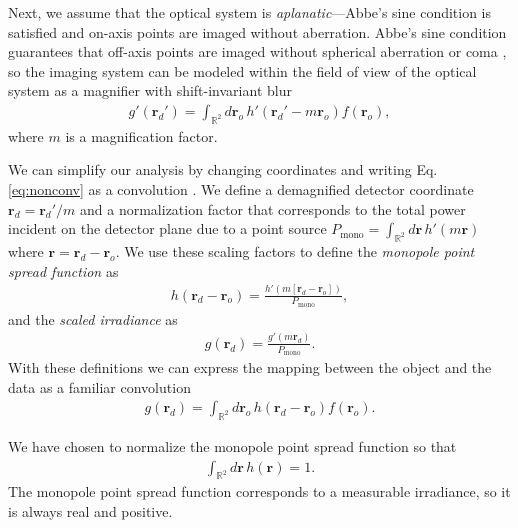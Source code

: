 \documentclass[]{osa-article}
\providecommand{\mb}[1]{\mathbf{#1}}
\providecommand{\ro}{\mathbf{\mathbf{r}}_o}
\providecommand{\rd}{\mathbf{r}_d}
\providecommand{\mbb}[1]{\mathbb{#1}}
\begin{document}
Next, we assume that the optical system is \textit{aplanatic}---Abbe's sine
condition is satisfied and on-axis points are imaged without aberration. Abbe's
sine condition guarantees that off-axis points are imaged without spherical
aberration or coma \cite[ch.~1]{mansuripur2009}, so the imaging system can
be modeled within the field of view of the optical system as a magnifier with
shift-invariant blur
\begin{align}
  g'(\rd') = \int_{\mbb{R}^2}d\ro\, h'(\rd' - m\ro)f(\ro), \label{eq:nonconv}
\end{align}
where $m$ is a magnification factor. 

We can simplify our analysis by changing coordinates and writing Eq.
\eqref{eq:nonconv} as a convolution \cite[ch.~7.2.7]{barrett2004}. We
define a demagnified detector coordinate $\rd = \rd'/m$ and a normalization
factor that corresponds to the total power incident on the detector plane due to
a point source $P_{\text{mono}} = \int_{\mbb{R}^2}d\mb{r}\,h'(m\mb{r})$ where
$\mb{r} = \rd - \ro$. We use these scaling factors to define the
\textit{monopole point spread function} as
\begin{align}
  h(\rd - \ro) = \frac{h'(m[\rd - \ro])}{P_{\text{mono}}},
\end{align}
and the \textit{scaled irradiance} as
\begin{align}
  g(\rd) = \frac{g'(m\rd)}{P_{\text{mono}}}.
\end{align}
With these definitions we can express the mapping between the object and the
data as a familiar convolution
\begin{align}
  g(\rd) = \int_{\mbb{R}^2}d\ro\, h(\rd - \ro)f(\ro).  \label{eq:lsi}
\end{align}

We have chosen to normalize the monopole point spread function so that
\begin{align}
  \int_{\mbb{R}^2}d\mb{r}\, h(\mb{r}) = 1. \label{eq:norm}
\end{align}
The monopole point spread function corresponds to a measurable irradiance, so it
is always real and positive.
\end{document}
